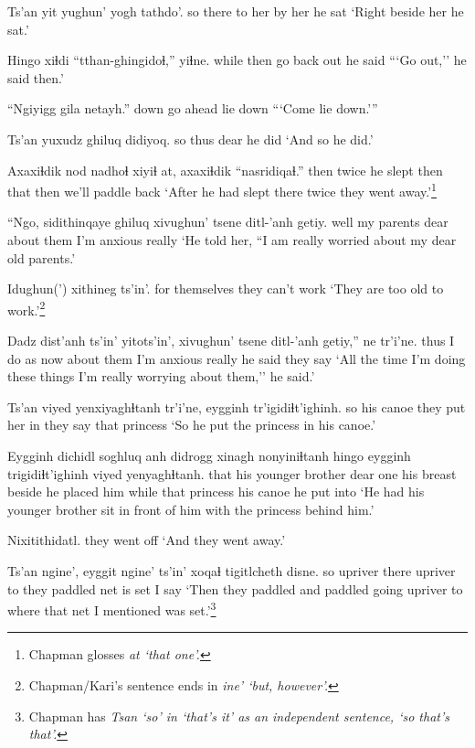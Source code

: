 \documentclass[12pt]{article}
\begin{document}
\gll Ts'an yit yughun' yogh  tathdo'.
so there {to her}  {by her}  {he sat}
\glt `Right beside her he sat.'
\glend

\gll Hingo xiɬdi ``tthan-ghingidoɬ,'' yiɬne.
while  then {go back out} {he said}
\glt ```Go out,'' he said then.'
\glend

\gll ``Ngiyigg gila netayh.''
down {go ahead} {lie down}
\glt ```Come lie down.'''
\glend

\gll Ts'an yuxudz ghiluq didiyoq.
so thus dear {he did}
\glt `And so he did.'
\glend

\gll Axaxiɬdik nod nadhoɬ xiyiɬ at, axaxiɬdik ``nasridiqaɬ.''
then  twice {he slept} then that then {we'll paddle back}
\glt `After he had slept there twice they went away.'\footnote{Chapman glosses \em at \em `that one'.}
\glend

\gll ``Ngo, sidithinqaye ghiluq xivughun' {tsene ditl-'anh} getiy.
well {my parents} dear  {about them} {I'm anxious}  really
\glt `He told her, ``I am really worried about my dear old parents.'
\glend

\gll Idughun(') {xithineg ts'in'.}
{for themselves} {they can't work}
\glt `They are too old to work.'\footnote{Chapman/Kari's sentence ends in \em ine' `but, however'.}
\glend

\gll Dadz dist'anh ts'in' yitots'in', xivughun' {tsene ditl-'anh} getiy,'' ne tr'i'ne.
thus {I do} as now {about them} {I'm anxious} really {he said} {they say}
\glt `All the time I'm doing these things I'm really worrying about them,'' he said.'
\glend

\gll Ts'an viyed  yenxiyaghɬtanh tr'i'ne, eygginh tr'igidiɬt'ighinh.
so {his canoe} {they put her in} {they say} that  princess
\glt `So he put the princess in his canoe.'
\glend

\gll Eygginh dichidl  soghluq anh  didrogg xinagh nonyiniɬtanh hingo eygginh trigidiɬt'ighinh viyed  yenyaghɬtanh.
that  {his younger brother} dear  one  {his breast} beside {he placed him} while that  princess  {his canoe} {he put into}
\glt `He had his younger brother sit in front of him with the princess behind him.'
\glend

\gll Nixitithidatl.
{{they went off}}
\glt `And they went away.'
\glend

\gll Ts'an ngine', eyggit ngine' ts'in' xoqaɬ tigitlcheth disne.
so upriver  there upriver  to {they paddled} {net is set} {I say}
\glt `Then they paddled and paddled going upriver to where that net I mentioned was set.'\footnote{Chapman has \em Tsan \em `so' \em in \em `that's it' as an independent sentence, `so that's that'. }
\glend
\end{document}
